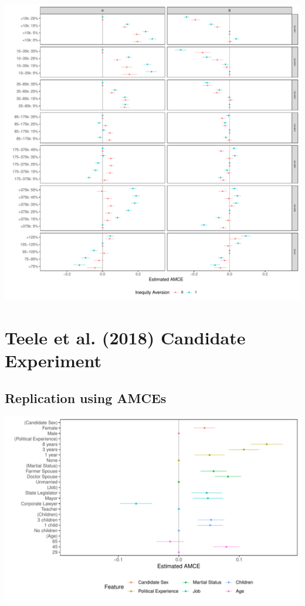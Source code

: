 \documentclass[a4paper,12pt]{article}\usepackage[]{graphicx}\usepackage[]{color}
\makeatletter
\def\maxwidth{ %
  \ifdim\Gin@nat@width>\linewidth
    \linewidth
  \else
    \Gin@nat@width
  \fi
}
\newenvironment{knitrout}{}{} %
\makeatother
\begin{document}
\begin{knitrout}
\color{fgcolor}
\includegraphics[width=\maxwidth]{figure/bms_subgroup_example_plot2-1} 

\end{knitrout}

\clearpage

\section{Teele et al. (2018) Candidate Experiment}

\subsection{Replication using AMCEs}

\begin{knitrout}
\color{fgcolor}
\includegraphics[width=\maxwidth]{figure/tkr_amce_appendix-1} 

\end{knitrout}
\end{document}
